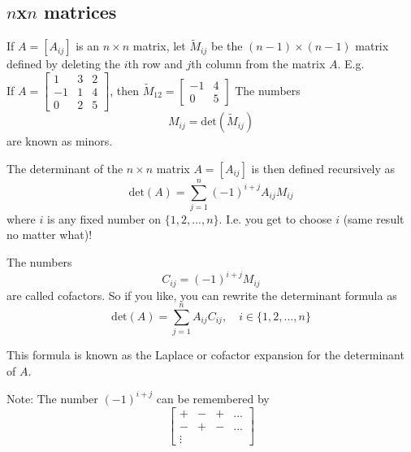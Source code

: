 \documentclass[11pt]{article}
\begin{document}
\subsection{$n$x$n$ matrices}
If $A= [A_{ij}]$ is an $n \times n$ matrix, let $\tilde{M}_{ij}$ be the $(n-1) \times (n-1)$ matrix defined by deleting the $i$th row and $j$th column from the matrix $A$.
E.g. \\
If $\displaystyle{A = \begin{bmatrix}
1 & 3 & 2\\
-1 & 1 & 4\\
0 & 2 & 5
\end{bmatrix}}$, then $\displaystyle{\tilde{M}_{12} =  \begin{bmatrix}
-1 & 4 \\
0 & 5
\end{bmatrix}  }$
The numbers
\[ M_{ij} = \text{det}(\tilde{M}_{ij}) \]
are known as minors.

The determinant of the $n \times n$ matrix $A=[A_{ij}]$ is then defined recursively as
\[ \text{det}(A) = \sum_{j=1}^n (-1)^{i+j}A_{ij} M_{ij} \]
where $i$ is any fixed number on $\{ 1, 2, ..., n \}$. I.e. you get to choose $i$ (same result no matter what)!

The numbers
\[ C_{ij} = (-1)^{i+j}M_{ij} \]
are called cofactors. So if you like, you can rewrite the determinant formula as
\[ \text{det}(A) = \sum_{j=1}^n A_{ij} C_{ij},\quad i \in \{1, 2, ..., n\} \]

This formula is known as the Laplace or cofactor expansion for the determinant of $A$.

Note: The number $(-1)^{i+j}$ can be remembered by
\[
\begin{bmatrix}
+ & - & + & ... \\
- & + & - & ... \\
\vdots
\end{bmatrix}
\]
\end{document}
